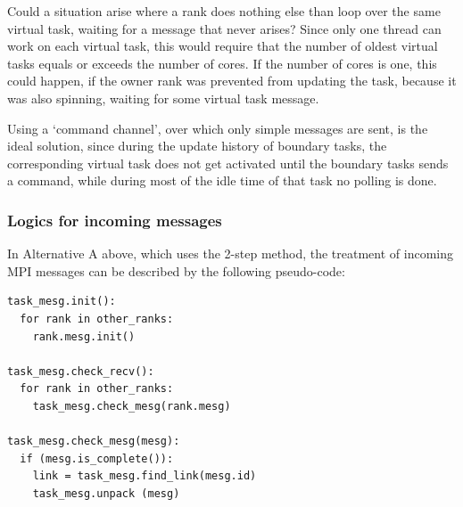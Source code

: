 \documentclass[paper=a4,fontsize=11pt]{scrartcl}
\numberwithin{equation}{section}		%
\numberwithin{figure}{section}			%
\numberwithin{table}{section}				%
\newcommand{\codecolor}{\color{Blue}}
\begin{document}
Could a situation arise where a rank does nothing else than loop over the same virtual task, waiting for a message that never arises?  Since only one thread can work on each virtual task, this would require that the number of oldest virtual tasks equals or exceeds the number of cores.  If the number of cores is one, this could happen, if the owner rank was prevented from updating the task, because it was also spinning, waiting for some virtual task message.

Using a `command channel', over which only simple messages are sent, is the ideal solution, since during the update history of boundary tasks, the corresponding virtual task does not get activated until the boundary tasks sends a command, while during most of the idle time of that task no polling is done.

\subsubsection{Logics for incoming messages}
In Alternative A above, which uses the 2-step method, the treatment of incoming MPI messages can be described by the following pseudo-code:
{\codecolor\begin{verbatim}
task_mesg.init():
  for rank in other_ranks:
    rank.mesg.init()

task_mesg.check_recv():
  for rank in other_ranks:
    task_mesg.check_mesg(rank.mesg)

task_mesg.check_mesg(mesg):
  if (mesg.is_complete()):
    link = task_mesg.find_link(mesg.id)
    task_mesg.unpack (mesg)
\end{verbatim}}

\end{document}
